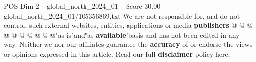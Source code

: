 \begin{textsample}{POS Dim 2 – global\_north\_2024\_01 – Score 30.00 – global\_north\_2024\_01/105356869.txt}
We are not responsible for, and do not control, such external websites, entities, applications or media \textbf{publishers} @ @ @ @ @ @ @ @ @ @"as is"and"as \textbf{available}"basis and has not been edited in any way.
Neither we nor our affiliates guarantee the \textbf{accuracy} of or endorse the views or opinions expressed in this article.
Read our full \textbf{disclaimer} policy here.

\end{textsample}
